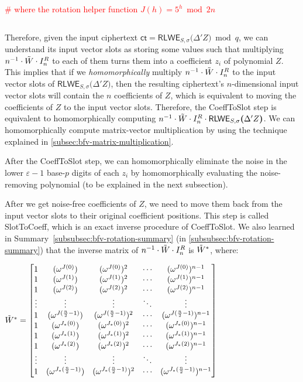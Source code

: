 $ $

\textcolor{red}{ \# where the rotation helper function $J(h) = 5^h \bmod 2n$}

$ $

Therefore, given the input ciphertext $\textsf{ct} = \textsf{RLWE}_{S, \sigma}\bm(\Delta' Z\bm) \bmod q$, we can understand its input vector slots as storing some values such that multiplying $n^{-1}\cdot\tilde{W} \cdot I_n^R$ to each of them turns them into a coefficient $z_i$ of polynomial $Z$. This implies that if we \textit{homomorphically} multiply $n^{-1}\cdot\tilde{W} \cdot I_n^R$ to the input vector slots of $\textsf{RLWE}_{S, \sigma}\bm(\Delta' Z\bm)$, then the resulting ciphertext's $n$-dimensional input vector slots will contain the $n$ coefficients of $Z$, which is equivalent to moving the coefficients of $Z$ to the input vector slots. Therefore, the \textsf{CoeffToSlot} step is equivalent to homomorphically computing $n^{-1}\cdot\tilde{W} \cdot I_n^R \cdot \textsf{RLWE}_{S, \sigma}\bm(\Delta' Z\bm)$. We can homomorphically compute matrix-vector multiplication by using the technique explained in \autoref{subsec:bfv-matrix-multiplication}.

After the \textsf{CoeffToSlot} step, we can homomorphically eliminate the noise in the lower $\varepsilon-1$ base-$p$ digits of each $z_i$ by homomorphically evaluating the noise-removing polynomial (to be explained in the next subsection).  

After we get noise-free coefficients of $Z$, we need to move them back from the input vector slots to their original coefficient positions. This step is called \textsf{SlotToCoeff}, which is an exact inverse procedure of \textsf{CoeffToSlot}. We also learned in Summary~\ref*{subsubsec:bfv-rotation-summary} (in \autoref{subsubsec:bfv-rotation-summary}) that the inverse matrix of $n^{-1}\cdot\tilde{W} \cdot I_n^R$ is $\tilde{W}^*$, where: 

$\tilde{W}^* = \begin{bmatrix}
1 & (\omega^{J(0)}) & (\omega^{J(0)})^2 & \cdots & (\omega^{J(0)})^{n-1}\\
1 & (\omega^{J(1)}) & (\omega^{J(1)})^2 & \cdots & (\omega^{J(1)})^{n-1}\\
1 & (\omega^{J(2)}) & (\omega^{J(2)})^2 & \cdots & (\omega^{J(2)})^{n-1}\\
\vdots & \vdots & \vdots & \ddots & \vdots \\
1 & (\omega^{J(\frac{n}{2}-1)}) & (\omega^{J(\frac{n}{2}-1)})^2 & \cdots & (\omega^{J(\frac{n}{2}-1)})^{n-1}\\
1 & (\omega^{J_*(0)}) & (\omega^{J_*(0)})^2 & \cdots & (\omega^{J_*(0)})^{n-1}\\
1 & (\omega^{J_*(1)}) & (\omega^{J_*(1)})^2 & \cdots & (\omega^{J_*(1)})^{n-1}\\
1 & (\omega^{J_*(2)}) & (\omega^{J_*(2)})^2 & \cdots & (\omega^{J_*(2)})^{n-1}\\
\vdots & \vdots & \vdots & \ddots & \vdots \\
1 & (\omega^{J_*(\frac{n}{2}-1)}) & (\omega^{J_*(\frac{n}{2}-1)})^2 & \cdots & (\omega^{J_*(\frac{n}{2}-1)})^{n-1}\\
\end{bmatrix}$

